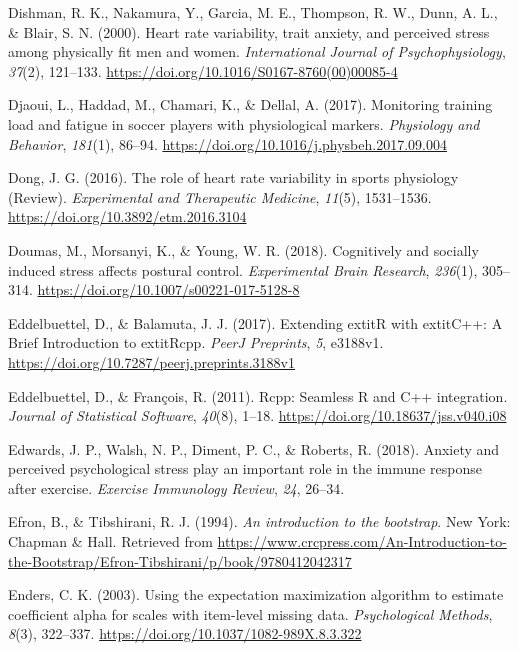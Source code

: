 \documentclass[man,floatsintext]{apa6}
\begin{document}
\leavevmode\hypertarget{ref-Dishman2000}{}%
Dishman, R. K., Nakamura, Y., Garcia, M. E., Thompson, R. W., Dunn, A. L., \& Blair, S. N. (2000). Heart rate variability, trait anxiety, and perceived stress among physically fit men and women. \emph{International Journal of Psychophysiology}, \emph{37}(2), 121--133. \url{https://doi.org/10.1016/S0167-8760(00)00085-4}

\leavevmode\hypertarget{ref-Djaoui2017}{}%
Djaoui, L., Haddad, M., Chamari, K., \& Dellal, A. (2017). Monitoring training load and fatigue in soccer players with physiological markers. \emph{Physiology and Behavior}, \emph{181}(1), 86--94. \url{https://doi.org/10.1016/j.physbeh.2017.09.004}

\leavevmode\hypertarget{ref-Dong2016a}{}%
Dong, J. G. (2016). The role of heart rate variability in sports physiology (Review). \emph{Experimental and Therapeutic Medicine}, \emph{11}(5), 1531--1536. \url{https://doi.org/10.3892/etm.2016.3104}

\leavevmode\hypertarget{ref-Doumas2018}{}%
Doumas, M., Morsanyi, K., \& Young, W. R. (2018). Cognitively and socially induced stress affects postural control. \emph{Experimental Brain Research}, \emph{236}(1), 305--314. \url{https://doi.org/10.1007/s00221-017-5128-8}

\leavevmode\hypertarget{ref-R-Rcpp_b}{}%
Eddelbuettel, D., \& Balamuta, J. J. (2017). Extending extitR with extitC++: A Brief Introduction to extitRcpp. \emph{PeerJ Preprints}, \emph{5}, e3188v1. \url{https://doi.org/10.7287/peerj.preprints.3188v1}

\leavevmode\hypertarget{ref-R-Rcpp_a}{}%
Eddelbuettel, D., \& François, R. (2011). Rcpp: Seamless R and C++ integration. \emph{Journal of Statistical Software}, \emph{40}(8), 1--18. \url{https://doi.org/10.18637/jss.v040.i08}

\leavevmode\hypertarget{ref-Edwards2018}{}%
Edwards, J. P., Walsh, N. P., Diment, P. C., \& Roberts, R. (2018). Anxiety and perceived psychological stress play an important role in the immune response after exercise. \emph{Exercise Immunology Review}, \emph{24}, 26--34.

\leavevmode\hypertarget{ref-Efron1993}{}%
Efron, B., \& Tibshirani, R. J. (1994). \emph{An introduction to the bootstrap}. New York: Chapman \& Hall. Retrieved from \url{https://www.crcpress.com/An-Introduction-to-the-Bootstrap/Efron-Tibshirani/p/book/9780412042317}

\leavevmode\hypertarget{ref-Enders2003}{}%
Enders, C. K. (2003). Using the expectation maximization algorithm to estimate coefficient alpha for scales with item-level missing data. \emph{Psychological Methods}, \emph{8}(3), 322--337. \url{https://doi.org/10.1037/1082-989X.8.3.322}
\end{document}
